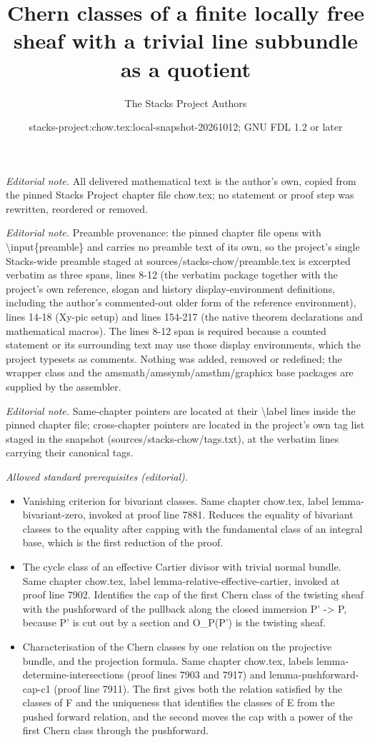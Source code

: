 \documentclass[10pt,a4paper]{amsart}
\title{Chern classes of a finite locally free sheaf with a trivial line subbundle as a quotient}
\author{The Stacks Project Authors}
\date{stacks-project:chow.tex:local-snapshot-20261012; GNU FDL 1.2 or later}
\theoremstyle{plain}
\theoremstyle{definition}
\theoremstyle{remark}
\numberwithin{equation}{subsection}
\begin{document}
\maketitle
\noindent\textit{Editorial note.} All delivered mathematical text is the author's own, copied from the pinned Stacks Project chapter file chow.tex; no statement or proof step was rewritten, reordered or removed.\par\medskip
\noindent\textit{Editorial note.} Preamble provenance: the pinned chapter file opens with \textbackslash{}input\{preamble\} and carries no preamble text of its own, so the project's single Stacks-wide preamble staged at sources/stacks-chow/preamble.tex is excerpted verbatim as three spans, lines 8-12 (the verbatim package together with the project's own reference, slogan and history display-environment definitions, including the author's commented-out older form of the reference environment), lines 14-18 (Xy-pic setup) and lines 154-217 (the native theorem declarations and mathematical macros). The lines 8-12 span is required because a counted statement or its surrounding text may use those display environments, which the project typesets as comments. Nothing was added, removed or redefined; the wrapper class and the amsmath/amssymb/amsthm/graphicx base packages are supplied by the assembler.\par\medskip
\noindent\textit{Editorial note.} Same-chapter pointers are located at their \textbackslash{}label lines inside the pinned chapter file; cross-chapter pointers are located in the project's own tag list staged in the snapshot (sources/stacks-chow/tags.txt), at the verbatim lines carrying their canonical tags.\par\medskip
\noindent\textit{Allowed standard prerequisites (editorial).}\begin{itemize}
\item Vanishing criterion for bivariant classes. Same chapter chow.tex, label lemma-bivariant-zero, invoked at proof line 7881. Reduces the equality of bivariant classes to the equality after capping with the fundamental class of an integral base, which is the first reduction of the proof.
\item The cycle class of an effective Cartier divisor with trivial normal bundle. Same chapter chow.tex, label lemma-relative-effective-cartier, invoked at proof line 7902. Identifies the cap of the first Chern class of the twisting sheaf with the pushforward of the pullback along the closed immersion P' -> P, because P' is cut out by a section and O\_P(P') is the twisting sheaf.
\item Characterisation of the Chern classes by one relation on the projective bundle, and the projection formula. Same chapter chow.tex, labels lemma-determine-intersections (proof lines 7903 and 7917) and lemma-pushforward-cap-c1 (proof line 7911). The first gives both the relation satisfied by the classes of F and the uniqueness that identifies the classes of E from the pushed forward relation, and the second moves the cap with a power of the first Chern class through the pushforward.
\end{itemize}\medskip
\end{document}
